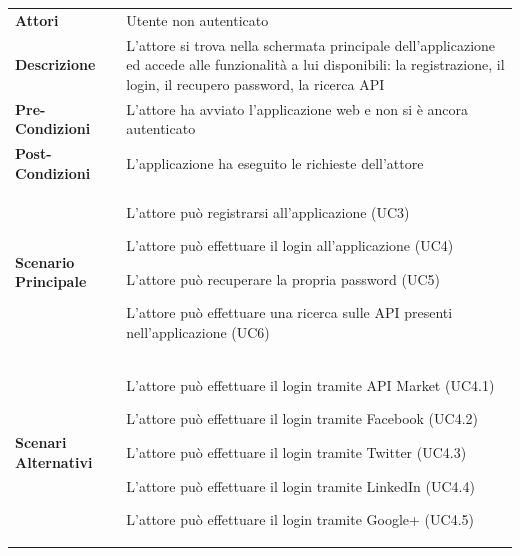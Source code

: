 \renewcommand*{\arraystretch}{1.6}
\begin{longtable}{ l | p{11cm}}
	\hline
	\rowcolor{Gray}
	\multicolumn{2}{c}{UC1 - Main pre-autenticazione} \\
	\hline
	\textbf{Attori} & Utente non autenticato  \\
	\textbf{Descrizione} & L'attore si trova nella schermata principale dell'applicazione ed accede alle funzionalità a lui disponibili: la registrazione, il login, il recupero password, la ricerca API \\
	\textbf{Pre-Condizioni} & L'attore ha avviato l'applicazione web e non si è ancora autenticato \\
	\textbf{Post-Condizioni} & L'applicazione ha eseguito le richieste dell'attore \\
	\textbf{Scenario Principale} & 
	\begin{enumerate*}[label=(\arabic*.),itemjoin={\newline}]
		\item L'attore può registrarsi all'applicazione (UC3)
		\item L'attore può effettuare il login all'applicazione (UC4)
		\item L'attore può recuperare la propria password (UC5)
		\item L'attore può effettuare una ricerca sulle API presenti nell'applicazione (UC6)
	\end{enumerate*}\\
	\textbf{Scenari Alternativi} & 
	\begin{enumerate*}[label=(\arabic*.),itemjoin={\newline}]
		\item L'attore può effettuare il login tramite API Market (UC4.1)
		\item L'attore può effettuare il login tramite Facebook (UC4.2)
		\item L'attore può effettuare il login tramite Twitter (UC4.3)
		\item L'attore può effettuare il login tramite LinkedIn (UC4.4)
		\item L'attore può effettuare il login tramite Google+ (UC4.5)
	\end{enumerate*}\\
\end{longtable}